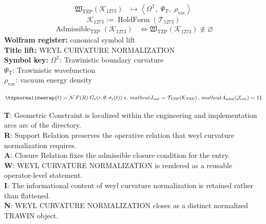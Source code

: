 \noindent
\begin{minipage}[t]{0.48\linewidth}
\begingroup
\small
\[
\begin{aligned}
\mathfrak{W}_{\mathrm{TZP}}\!\left(\mathcal{K}_{1273}\right)
&\longmapsto
\left\langle \Omega^{\mathbb{T}},\; \Psi_{\mathrm{T}},\; \rho_{\mathrm{vac}} \right\rangle
\end{aligned}
\]
\[
\mathcal{K}_{1273}
:=
\operatorname{HoldForm}\!\left(\mathcal{T}_{1273}\right)
\]
\[
\begin{aligned}
\operatorname{Admissible}_{\mathrm{TZP}}\!\left(\mathcal{K}_{1273}\right)
&\Longleftrightarrow
\mathfrak{W}_{\mathrm{TZP}}\!\left(\mathcal{K}_{1273}\right)\not\equiv\varnothing
\end{aligned}
\]
\textbf{Wolfram register:} canonical symbol lift\\
\textbf{Title lift:} WEYL CURVATURE NORMALIZATION\\
\textbf{Symbol key:} \(\Omega^{\mathbb{T}}\): Trawinistic boundary curvature\\ \(\Psi_{\mathrm{T}}\): Trawinistic wavefunction\\ \(\rho_{\mathrm{vac}}\): vacuum energy density
\par
\endgroup
\end{minipage}\hfill
\begin{minipage}[t]{0.48\linewidth}
\[
\tzpnormalizewrap{t)=\mathcal N\,F(R)\;G_\ell(r,\theta;\sigma_{\mathrm{r}}(t)) \;\ast,\,mathcal{J}_{\mathrm{out}} = \mathcal{T}_{\mathrm{TZP}}\!\left(\mathcal{K}_{\mathrm{TZP}}\right),\,mathcal{A}_{\mathrm{adm}}\!\left(\mathcal{J}_{\mathrm{out}}\right)=1}
\]

\small
\textbf{T}: Geometric Constraint is localized within the engineering and implementation arcs arc of the directory.\\
\textbf{R}: Support Relation preserves the operative relation that weyl curvature normalization requires.\\
\textbf{A}: Closure Relation fixes the admissible closure condition for the entry.\\
\textbf{W}: WEYL CURVATURE NORMALIZATION is rendered as a reusable operator-level statement.\\
\textbf{I}: The informational content of weyl curvature normalization is retained rather than flattened.\\
\textbf{N}: WEYL CURVATURE NORMALIZATION closes as a distinct normalized TRAWIN object.
\normalsize
\end{minipage}

